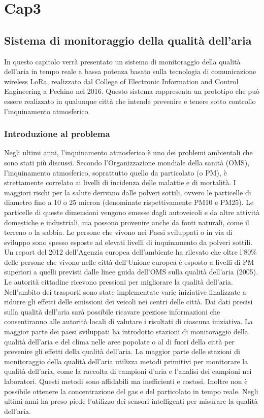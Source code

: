 \documentclass[a4paper]{report} %
\begin{document}
\chapter{Cap3}
\section{Sistema di monitoraggio della qualità dell'aria}

In questo capitolo verrà presentato un sistema di monitoraggio della qualità dell'aria in tempo reale a bassa potenza basato sulla tecnologia di comunicazione wireless LoRa, realizzato dal College of Electronic Information and Control Engineering a Pechino nel 2016. Questo sistema rappresenta un prototipo che può essere realizzato in qualunque città che intende prevenire e tenere sotto controllo l'inquinamento atmosferico.

\subsection{Introduzione al problema}
Negli ultimi anni, l'inquinamento atmosferico è uno dei problemi ambientali che sono stati più discussi. Secondo l'Organizzazione mondiale della sanità (OMS), l'inquinamento atmosferico, soprattutto quello da particolato (o PM), è strettamente correlato ai livelli di incidenza delle malattie e di mortalità. I maggiori rischi per la salute derivano dalle polveri sottili, ovvero le particelle di diametro fino a 10 o 25 micron (denominate rispettivamente PM10 e PM25). Le particelle di queste dimensioni vengono emesse dagli autoveicoli e da altre attività domestiche e industriali, ma possono provenire anche da fonti naturali, come il terreno o la sabbia. Le persone che vivono nei Paesi sviluppati o in via di sviluppo sono spesso esposte ad elevati livelli di inquinamento da polveri sottili. Un report del 2012 dell'Agenzia europea dell'ambiente ha rilevato che oltre l'80\% delle persone che vivono nelle città dell'Unione europea è esposto a livelli di PM superiori a quelli previsti dalle linee guida dell'OMS sulla qualità dell'aria (2005). Le autorità cittadine ricevono pressioni per migliorare la qualità dell'aria. Nell'ambito dei trasporti sono state implementate varie iniziative finalizzate a ridurre gli effetti delle emissioni dei veicoli nei centri delle città. Dai dati precisi sulla qualità dell'aria sarà possibile ricavare preziose informazioni che consentiranno alle autorità locali di valutare i risultati di ciascuna iniziativa. La maggior parte dei paesi sviluppati ha introdotto stazioni di monitoraggio della qualità dell'aria e del clima nelle aree popolate o al di fuori della città per prevenire gli effetti della qualità dell'aria. La maggior parte delle stazioni di monitoraggio della qualità dell'aria utilizza metodi primitivi per monitorare la qualità dell'aria, come la raccolta di campioni d'aria e l'analisi dei campioni nei laboratori. Questi metodi sono affidabili ma inefficienti e costosi. Inoltre non è possibile ottenere la concentrazione del gas e del particolato in tempo reale. Negli ultimi anni ha preso piede l'utilizzo dei sensori intelligenti per misurare la qualità dell'aria.
\end{document}
